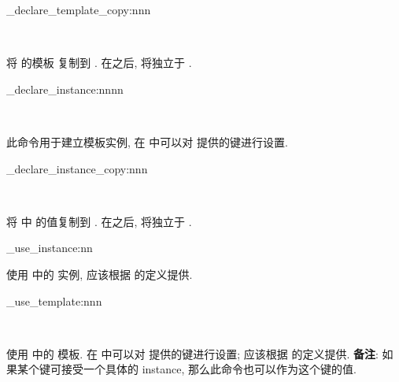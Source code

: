 \begin{function}[added=2025-09-17]{\ztex_declare_template_copy:nnn}
  \begin{syntax}
    ~~~~
  \end{syntax}
  将  的模板  复制到 .
  在之后,  将独立于 .
\end{function}


\begin{function}[added=2025-09-17]{\ztex_declare_instance:nnnn}
  \begin{syntax}
    ~~~~
    ~~~~
  \end{syntax}
  此命令用于建立模板实例, 在  中可以对 
  提供的键进行设置.
\end{function}


\begin{function}[added=2025-09-17]{\ztex_declare_instance_copy:nnn}
  \begin{syntax}
    ~~~~
  \end{syntax}
  将  中  的值复制到 .
  在之后,  将独立于 .
\end{function}


\begin{function}[added=2025-09-17]{\ztex_use_instance:nn}
  \begin{syntax}
     
  \end{syntax}
  使用  中的  实例, 
  应该根据  的定义提供.
\end{function}


\begin{function}[added=2025-09-17]{\ztex_use_template:nnn}
  \begin{syntax}
    ~~~~
    ~~~~
  \end{syntax}
  使用  中的  模板. 在  中可以对 
  提供的键进行设置;  应该根据  的定义提供. 
  \textbf{备注}: 如果某个键可接受一个具体的 instance, 那么此命令也可以作为这个键的值.
\end{function}



